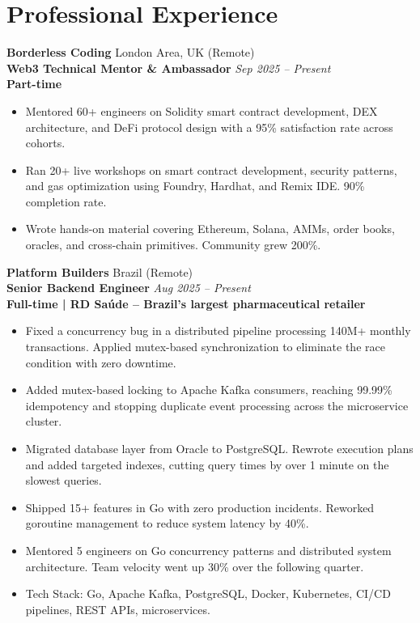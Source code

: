 \documentclass[10pt,a4paper]{article}
\newcommand{\experienceheader}[4]{
    \textbf{\color{subtitlecolor}#1} \hfill #2\\
    \textbf{#3} \hfill \textit{#4}\\
}
\begin{document}
\section{Professional Experience}

\vspace{2pt}
\experienceheader{Borderless Coding}{London Area, UK (Remote)}{Web3 Technical Mentor \& Ambassador}{Sep 2025 -- Present}
\textbf{\footnotesize Part-time}
\begin{itemize}
    \item {\footnotesize Mentored 60+ engineers on Solidity smart contract development, DEX architecture, and DeFi protocol design with a 95\% satisfaction rate across cohorts.}
    \item {\footnotesize Ran 20+ live workshops on smart contract development, security patterns, and gas optimization using Foundry, Hardhat, and Remix IDE. 90\% completion rate.}
    \item {\footnotesize Wrote hands-on material covering Ethereum, Solana, AMMs, order books, oracles, and cross-chain primitives. Community grew 200\%.}
\end{itemize}

\vspace{2pt}
\experienceheader{Platform Builders}{Brazil (Remote)}{Senior Backend Engineer}{Aug 2025 -- Present}
\textbf{\footnotesize Full-time | RD Sa\'{u}de -- Brazil's largest pharmaceutical retailer}
\begin{itemize}
    \item {\footnotesize Fixed a concurrency bug in a distributed pipeline processing 140M+ monthly transactions. Applied mutex-based synchronization to eliminate the race condition with zero downtime.}
    \item {\footnotesize Added mutex-based locking to Apache Kafka consumers, reaching 99.99\% idempotency and stopping duplicate event processing across the microservice cluster.}
    \item {\footnotesize Migrated database layer from Oracle to PostgreSQL. Rewrote execution plans and added targeted indexes, cutting query times by over 1 minute on the slowest queries.}
    \item {\footnotesize Shipped 15+ features in Go with zero production incidents. Reworked goroutine management to reduce system latency by 40\%.}
    \item {\footnotesize Mentored 5 engineers on Go concurrency patterns and distributed system architecture. Team velocity went up 30\% over the following quarter.}
    \item {\footnotesize Tech Stack: Go, Apache Kafka, PostgreSQL, Docker, Kubernetes, CI/CD pipelines, REST APIs, microservices.}
\end{itemize}
\end{document}

